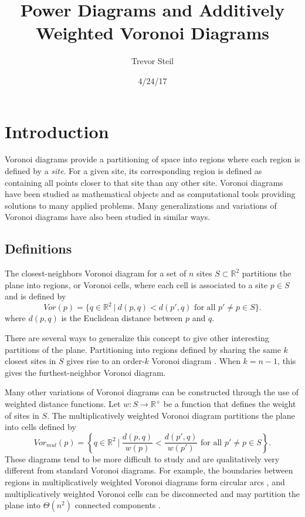 \documentclass[a4paper, 11pt]{article}
\title{Power Diagrams and Additively Weighted Voronoi Diagrams }
\date{4/24/17}
\author{Trevor Steil}
\newcommand{\R}{\mathbb{R}}
\begin{document}
\maketitle

\section{Introduction}
Voronoi diagrams provide a partitioning of space into regions where each region is defined by a \textit{site}. For a given site, its corresponding
region is defined as containing all points closer to that site than any other site. Voronoi diagrams have been studied as mathematical objects and as
computational tools providing solutions to many applied problems. Many generalizations and variations of Voronoi diagrams have also been studied in
similar ways.

\subsection{Definitions}

The closest-neighbors Voronoi diagram for a set of $n$ sites $S \subset \R^2$ partitions the plane into regions, or Voronoi cells, where each cell is associated to a
site $p \in S$ and is defined by
\begin{equation*}
  Vor(p) = \{ q \in \R^2 \ | \ d(p,q) < d(p',q) \text{ for all } p' \neq p \in S \} .
\end{equation*}
where $d(p,q)$ is the Euclidean distance between $p$ and $q$.

There are several ways to generalize this concept to give other interesting partitions of the plane. Partitioning into regions defined by sharing the
same $k$ closest sites in $S$ gives rise to an order-$k$ Voronoi diagram \cite{aurenhammer_survey}. When $k=n-1$, this gives the furthest-neighbor
Voronoi diagram.

Many other variations of Voronoi diagrams can be constructed through the use of weighted distance functions. Let $w: S \to \R^+$ be a function that defines
the weight of sites in $S$. The multiplicatively weighted Voronoi diagram partitions the plane into cells defined by
\begin{equation*}
  Vor_{mul}(p) = \left\{ q \in \R^2 \ \big| \ \frac{d(p,q)}{w(p)} < \frac{d(p',q)}{w(p')} \text{ for all } p' \neq p \in S \right\}.
\end{equation*}
These diagrams tend to be more difficult to study and are qualitatively very different from standard Voronoi diagrams. For example,
the boundaries between regions in multiplicatively weighted Voronoi diagrams form circular arcs \cite{ash-bolker}, and multiplicatively weighted Voronoi
cells can be disconnected and may partition the plane into $\Theta(n^2)$ connected components \cite{aurenhammer_survey}.
\end{document}
